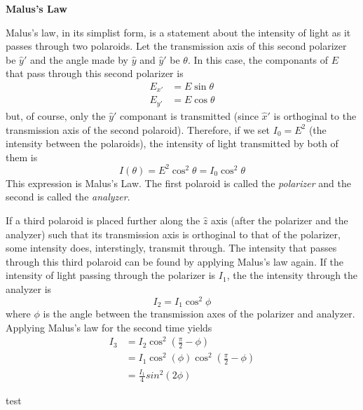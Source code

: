 \documentclass[11pt]{article}
\begin{document}
\begin{multicols}{2}
     \selectfont \textbf{Malus's Law}
    
     \selectfont 

    Malus's law, in its simplist form, is a statement about the intensity of light as it passes through two polaroids. Let the transmission axis of this second polarizer be $\hat{y}'$ and the angle made by $\hat{y}$ and $\hat{y}'$ be $\theta$. In this case, the componants of $E$ that pass through this second polarizer is
    \[
        \begin{split}
            E_{x'} &= E \sin \theta \\
            E_{y'} &= E \cos \theta
        \end{split}
    \]
    but, of course, only the $\hat{y}'$ componant is transmitted (since $\hat{x}'$ is orthoginal to the transmission axis of the second polaroid). Therefore, if we set $I_0 = E^2$ (the intensity between the polaroids), the intensity of light transmitted by both of them is
    \begin{equation}
        \label{MalusLaw}
        I(\theta) = E^2 \cos^2\theta = I_0 \cos^2\theta
    \end{equation}
    This expression is Malus's Law. The first polaroid is called the \textit{polarizer} and the second is called the \textit{analyzer}.

    If a third polaroid is placed further along the $\hat{z}$ axis (after the polarizer and the analyzer) such that its transmission axis is orthoginal to that of the polarizer, some intensity does, interstingly, transmit through. The intensity that passes through this third polaroid can be found by applying Malus's law again. If the intensity of light passing through the polarizer is $I_1$, the the intensity through the analyzer is
    \[
        I_2 = I_1 \cos^2 \phi
    \]
    where $\phi$ is the angle between the transmission axes of the polarizer and analyzer. Applying Malus's law for the second time yields
    \begin{equation}
        \begin{split}
            I_3 &= I_2 \cos^2 (\frac{\pi}{2} - \phi) \\
            &= I_1 \cos^2 (\phi) \cos^2 (\frac{\pi}{2} - \phi) \\
            & = \frac{I_1}{4} sin^2 (2 \phi) \label{MalusLaw3}
        \end{split}
    \end{equation}

    test


\end{multicols}
\end{document}
